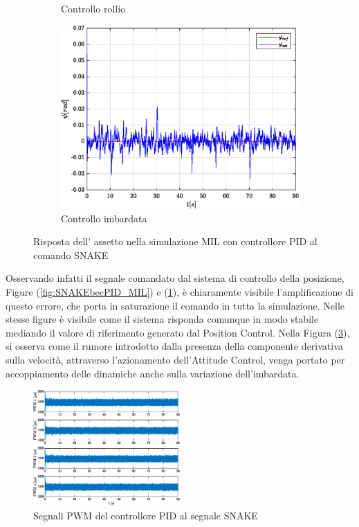 \begin{figure}
\begin{subfigure}{0.45\textwidth}
		\caption{Controllo rollio}
		\label{fig:SNAKErolPID_MIL}
	\end{subfigure}
	\hfill
	\begin{subfigure}{0.45\textwidth}
		\centering
		\includegraphics[width=1\textwidth]{Simulazioni/Figure/PID/SNAKE_MIL/AttitudeControlYaw}
		\caption{Controllo imbardata}
		\label{fig:SNAKEyawPID_MIL}
	\end{subfigure}
	\caption{Risposta dell' assetto nella simulazione MIL con controllore PID al comando SNAKE}
\end{figure}

Osservando infatti il segnale comandato dal sistema di controllo della posizione, Figure (\ref{fig:SNAKEbecPID_MIL}) e (\ref{fig:SNAKErolPID_MIL}), è chiaramente visibile l'amplificazione di questo errore, che porta in saturazione il comando in tutta la simulazione. Nelle stesse figure è visibile come il sistema risponda comunque in modo stabile mediando il valore di riferimento generato dal Position Control. Nella Figura (\ref{fig:SNAKEyawPID_MIL}), si osserva come il rumore introdotto dalla presenza della componente derivativa sulla velocità, attraverso l'azionamento dell'Attitude Control, venga portato per accoppiamento delle dinamiche anche sulla variazione dell'imbardata.

\begin{figure}
	\centering
	\includegraphics[width=0.5\textwidth]{Simulazioni/Figure/PID/SNAKE_MIL/PWM}
	\caption{Segnali PWM del controllore PID al segnale SNAKE}
	\label{fig:SNAKEPWMPID_MIL}
\end{figure}

